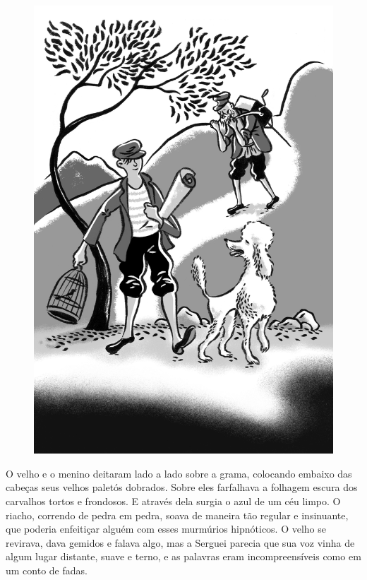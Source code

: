 \begin{figure}%
\vspace*{-1.6cm}
\hspace*{-2cm}\includegraphics[width=140mm]{./imgs/cena10.jpg}
\end{figure}

O velho e o menino deitaram lado a lado sobre a grama, colocando embaixo
das cabeças seus velhos paletós dobrados. Sobre eles farfalhava a
folhagem escura dos carvalhos tortos e frondosos. E através dela surgia
o azul de um céu limpo. O riacho, correndo de pedra em pedra, soava de
maneira tão regular e insinuante, que poderia enfeitiçar alguém com
esses murmúrios hipnóticos. O velho se revirava, dava gemidos e falava
algo, mas a Serguei parecia que sua voz vinha de algum lugar distante,
suave e terno, e as palavras eram incompreensíveis como em um conto de
fadas.

